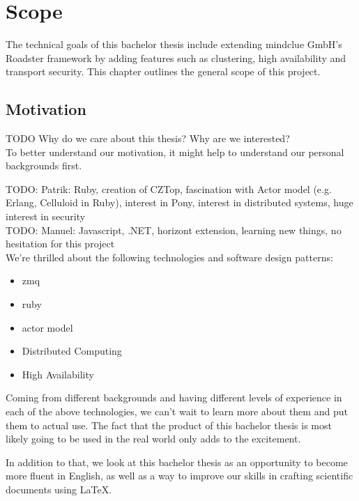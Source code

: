 \chapter{Scope}
The technical goals of this bachelor thesis include extending mindclue GmbH's
Roadster framework by adding features such as clustering, high availability and
transport security. This chapter outlines the general scope of this project.

\section{Motivation}
TODO Why do we care about this thesis? Why are we interested?\\

To better understand our motivation, it might help to understand our personal backgrounds first.

TODO: Patrik: Ruby, creation of CZTop, fascination with Actor model (e.g. Erlang, Celluloid in Ruby), interest in Pony, interest in distributed systems, huge interest in security\\
TODO: Manuel: Javascript, .NET, horizont extension, learning new things, no hesitation for this project\\

We're thrilled about the following technologies and software design patterns:

\begin{itemize}
	\item \gls{zmq}
	\item \gls{ruby}
	\item \gls{actor model}
	\item Distributed Computing
	\item High Availability
\end{itemize}


Coming from different backgrounds and having different levels of experience in
each of the above technologies, we can't wait to learn more about them and put
them to actual use. The fact that the product of this bachelor thesis is most
likely going to be used in the real world only adds to the excitement.

In addition to that, we look at this bachelor thesis as an opportunity to
become more fluent in English, as well as a way to improve our skills in
crafting scientific documents using {\LaTeX}.

